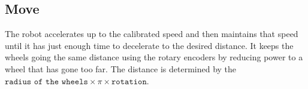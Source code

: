 \subsection{Move}
The robot accelerates up to the calibrated speed and then maintains that speed until it has just enough time to decelerate to the desired distance. It keeps the wheels going the same distance using the rotary encoders by reducing power to a wheel that has gone too far. The distance is determined by the
 $\texttt{radius of the wheels} \times \pi \times \texttt{rotation}$. 

